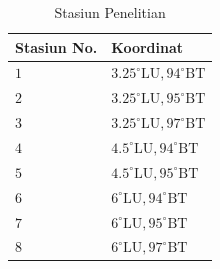 \begin{spacing}{1.5}
	\begin{table}[htp]
		\centering
		\caption{Stasiun Penelitian}
		\label{table:stasiun}
		\begin{tabular}{ll}
			Stasiun No. & Koordinat \\ \hline
			$1$ & $3.25^\circ \text{LU}, 94^\circ \text{BT}$ \\
			$2$ & $3.25^\circ \text{LU}, 95^\circ \text{BT}$ \\
			$3$ & $3.25^\circ \text{LU}, 97^\circ \text{BT}$ \\
			$4$ & $4.5^\circ \text{LU}, 94^\circ \text{BT}$ \\
			$5$ & $4.5^\circ \text{LU}, 95^\circ \text{BT}$ \\
			$6$ & $6^\circ \text{LU}, 94^\circ \text{BT}$ \\
			$7$ & $6^\circ \text{LU}, 95^\circ \text{BT}$ \\
			$8$ & $6^\circ \text{LU}, 97^\circ \text{BT}$ 
		\end{tabular}
	\end{table}
\end{spacing}
\vspace{-1pc}

